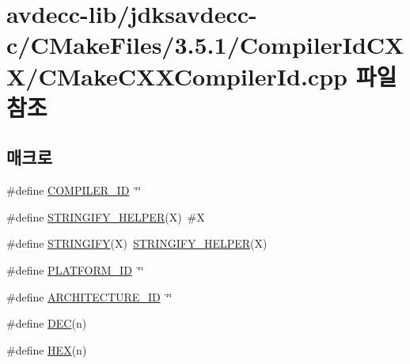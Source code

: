 \hypertarget{avdecc-lib_2jdksavdecc-c_2_c_make_files_23_85_81_2_compiler_id_c_x_x_2_c_make_c_x_x_compiler_id_8cpp}{}\section{avdecc-\/lib/jdksavdecc-\/c/\+C\+Make\+Files/3.5.1/\+Compiler\+Id\+C\+X\+X/\+C\+Make\+C\+X\+X\+Compiler\+Id.cpp 파일 참조}
\label{avdecc-lib_2jdksavdecc-c_2_c_make_files_23_85_81_2_compiler_id_c_x_x_2_c_make_c_x_x_compiler_id_8cpp}
\subsection*{매크로}
\begin{DoxyCompactItemize}
\item 
\#define \hyperlink{avdecc-lib_2jdksavdecc-c_2_c_make_files_23_85_81_2_compiler_id_c_x_x_2_c_make_c_x_x_compiler_id_8cpp_a81dee0709ded976b2e0319239f72d174}{C\+O\+M\+P\+I\+L\+E\+R\+\_\+\+ID}~\char`\"{}\char`\"{}
\item 
\#define \hyperlink{avdecc-lib_2jdksavdecc-c_2_c_make_files_23_85_81_2_compiler_id_c_x_x_2_c_make_c_x_x_compiler_id_8cpp_a2ae9b72bb13abaabfcf2ee0ba7d3fa1d}{S\+T\+R\+I\+N\+G\+I\+F\+Y\+\_\+\+H\+E\+L\+P\+ER}(X)~\#X
\item 
\#define \hyperlink{avdecc-lib_2jdksavdecc-c_2_c_make_files_23_85_81_2_compiler_id_c_x_x_2_c_make_c_x_x_compiler_id_8cpp_a43e1cad902b6477bec893cb6430bd6c8}{S\+T\+R\+I\+N\+G\+I\+FY}(X)~\hyperlink{lib_2avtp__pipeline_2build__avdecc_2_c_make_files_23_85_81_2_compiler_id_c_x_x_2_c_make_c_x_x_compiler_id_8cpp_a2ae9b72bb13abaabfcf2ee0ba7d3fa1d}{S\+T\+R\+I\+N\+G\+I\+F\+Y\+\_\+\+H\+E\+L\+P\+ER}(X)
\item 
\#define \hyperlink{avdecc-lib_2jdksavdecc-c_2_c_make_files_23_85_81_2_compiler_id_c_x_x_2_c_make_c_x_x_compiler_id_8cpp_adbc5372f40838899018fadbc89bd588b}{P\+L\+A\+T\+F\+O\+R\+M\+\_\+\+ID}~\char`\"{}\char`\"{}
\item 
\#define \hyperlink{avdecc-lib_2jdksavdecc-c_2_c_make_files_23_85_81_2_compiler_id_c_x_x_2_c_make_c_x_x_compiler_id_8cpp_aba35d0d200deaeb06aee95ca297acb28}{A\+R\+C\+H\+I\+T\+E\+C\+T\+U\+R\+E\+\_\+\+ID}~\char`\"{}\char`\"{}
\item 
\#define \hyperlink{avdecc-lib_2jdksavdecc-c_2_c_make_files_23_85_81_2_compiler_id_c_x_x_2_c_make_c_x_x_compiler_id_8cpp_ad1280362da42492bbc11aa78cbf776ad}{D\+EC}(n)
\item 
\#define \hyperlink{avdecc-lib_2jdksavdecc-c_2_c_make_files_23_85_81_2_compiler_id_c_x_x_2_c_make_c_x_x_compiler_id_8cpp_a46d5d95daa1bef867bd0179594310ed5}{H\+EX}(n)
\end{DoxyCompactItemize}
